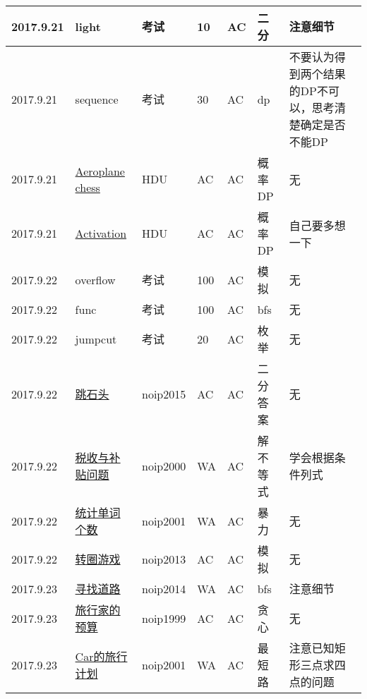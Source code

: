 \documentclass[a4paper]{article}
\begin{document}
\begin{longtable}{|p{1.5cm}|p{2.5cm}|p{1.6cm}|p{1.6cm}|p{1cm}|p{3cm}|p{4cm}|}
		\hline
		2017.9.21 & light
		 & 考试 & 10 & AC & 二分 & 注意细节\\
		
		\hline
		2017.9.21 & sequence
		 & 考试 & 30 & AC & dp & 不要认为得到两个结果的DP不可以，思考清楚确定是否不能DP\\
		
		\hline
		2017.9.21 & \href {https://vjudge.net/problem/HDU-4405}{Aeroplane chess}
		 & HDU & AC & AC & 概率DP & 无\\
		
		\hline
		2017.9.21 & \href {https://vjudge.net/problem/HDU-4089}{Activation}
		 & HDU & AC & AC & 概率DP & 自己要多想一下\\

		\hline
		2017.9.22 & overflow
		 & 考试 & 100 & AC & 模拟 & 无\\
		
		\hline
		2017.9.22 & func
		 & 考试 & 100 & AC & bfs & 无\\
		
		\hline
		2017.9.22 & jumpcut
		 & 考试 & 20 & AC & 枚举 & 无\\
		
		\hline
		2017.9.22 & \href {https://www.luogu.org/problem/show?pid=2678#sub}{跳石头}
		 & noip2015 & AC & AC & 二分答案 & 无\\
		
		\hline
		2017.9.22 & \href {https://www.luogu.org/problem/show?pid=1023#sub}{税收与补贴问题}
		 & noip2000 & WA & AC & 解不等式 & 学会根据条件列式\\
		
		\hline
		2017.9.22 & \href {https://www.luogu.org/problem/show?pid=1026#sub}{统计单词个数}
		 & noip2001 & WA & AC & 暴力 & 无\\
		
		\hline
		2017.9.22 & \href {https://www.luogu.org/problem/show?pid=1965#sub}{转圈游戏}
		 & noip2013 & AC & AC & 模拟 & 无\\
		
		\hline
		2017.9.23 & \href {https://www.luogu.org/problem/show?pid=2296#sub}{寻找道路}
		 & noip2014 & WA & AC & bfs & 注意细节\\
		
		\hline
		2017.9.23 & \href {https://www.luogu.org/problem/show?pid=1016#sub}{旅行家的预算}
		 & noip1999 & AC & AC & 贪心 & 无\\
		
		\hline
		2017.9.23 & \href {https://www.luogu.org/problem/show?pid=1027#sub}{Car的旅行计划}
		 & noip2001 & WA & AC & 最短路 & 注意已知矩形三点求四点的问题\\
		

\end{longtable}
\end{document}
